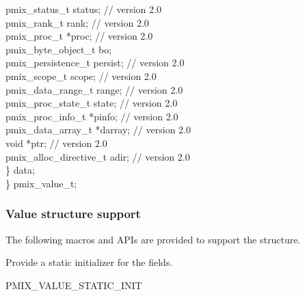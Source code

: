 {\hspace*{8\sigspace}pmix_status_t status;           // version 2.0 \\
\hspace*{8\sigspace}pmix_rank_t rank;               // version 2.0 \\
\hspace*{8\sigspace}pmix_proc_t *proc;              // version 2.0 \\
\hspace*{8\sigspace}pmix_byte_object_t bo; \\
\hspace*{8\sigspace}pmix_persistence_t persist;     // version 2.0 \\
\hspace*{8\sigspace}pmix_scope_t scope;             // version 2.0 \\
\hspace*{8\sigspace}pmix_data_range_t range;        // version 2.0 \\
\hspace*{8\sigspace}pmix_proc_state_t state;        // version 2.0 \\
\hspace*{8\sigspace}pmix_proc_info_t *pinfo;        // version 2.0 \\
\hspace*{8\sigspace}pmix_data_array_t *darray;      // version 2.0 \\
\hspace*{8\sigspace}void *ptr;                      // version 2.0 \\
\hspace*{8\sigspace}pmix_alloc_directive_t adir;    // version 2.0 \\
\hspace*{4\sigspace}\} data; \\
\} pmix_value_t;
}

\subsubsection{Value structure support}
The following macros and \acp{API} are provided to support the  structure.


Provide a static initializer for the  fields.

\cspecificstart
\begin{codepar}
PMIX_VALUE_STATIC_INIT
\end{codepar}
\cspecificend


